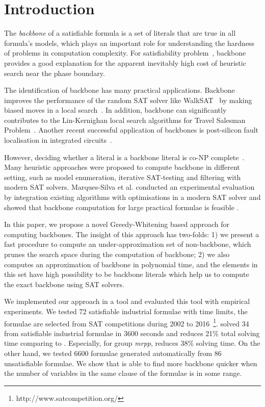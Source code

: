 

\section{Introduction}
The \textit{backbone} of a satisfiable formula is a set of literals that are true in all formula's models,
which plays an important role for understanding the hardness of problems in computation complexity.
For satisfiability problem~\cite{MZKST99},  backbone provides a good explanation for the apparent inevitably high cost of heuristic search near the phase boundary.

The identification of backbone  has many practical applications. Backbone improves the performance of the random SAT solver like  WalkSAT~\cite{SBK1993} by making biased moves in a local search~\cite{ZWR2003,MAR2007}. In addition, backbone can significantly contributes to the Lin-Kernighan local search algorithms for Travel Salesman Problem~\cite{ZWL2005}. Another recent successful application of backbones is post-silicon fault localisation in integrated circuits~\cite{ZWSM11,ZWM11}.

However, deciding whether a literal is a backbone literal is co-NP complete~\cite{Jan10}. Many heuristic approaches were proposed to compute backbone in different setting, such as model enumeration, iterative SAT-testing and filtering with modern SAT solvers.
Marques-Silva et al. conducted an experimental evaluation by integration existing algorithms with optimisations in a modern SAT solver and showed that backbone computation for large practical formulae is feasible \cite{MJML2010,JLMS12,JLM15}.


In this paper, we propose a novel Greedy-Whitening based approach \tool for computing backbones. The insight of this approach has two-folds: 1) we present a fast procedure to compute an under-approximation set of non-backbone, which prunes the search space during the computation of backbone; 2) we also computes an approximation of backbone in polynomial time, and the elements in this set have high possibility to be  backbone literals which help us to  compute the exact backbone using SAT solvers.

We implemented our approach in a tool \tool and evaluated this tool with empirical experiments. We tested 72 satisfiable industrial formulae with time limits, the formulae are selected from SAT competitions during 2002 to 2016~\footnote{http://www.satcompetition.org/}.  \tool solved 34 from satisfiable industrial formulae in 3600 seconds and reduces 21\% total solving time comparing to \minibones. Especially, for group \textit{mrpp}, \tool reduces 38\% solving time. On the other hand, we tested  6600 formulae generated automatically from 86 unsatisfiable formulae. We show that \tool is able to find more backbone quicker when the number of variables in the same clause of the formulae is in some range.
